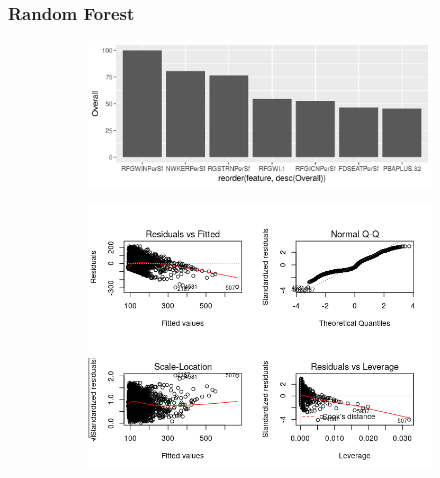 \subsubsection{Random Forest}
\label{appendix:electricity:rf}
\begin{figure}[h]
\begin{subfigure}{1\textwidth}
\includegraphics[width=.99\textwidth, height=0.35\textheight]{Images/electricity_rf_vars.png}
\centering
\end{subfigure}
\begin{subfigure}{1\textwidth}
\includegraphics[width=.99\textwidth, height=0.42\textheight]{Images/electricity_rf_res.png}
\centering
\end{subfigure}
\end{figure}